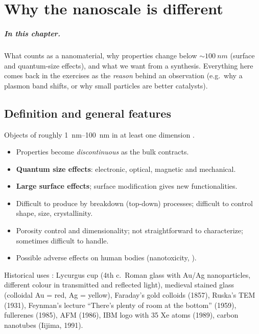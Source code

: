 \chapter{Why the nanoscale is different}
\label{ch:fundamentals}

\paragraph{In this chapter.} What counts as a nanomaterial, why properties change below
$\sim\SI{100}{nm}$ (surface and quantum-size effects), and what we want from a synthesis.
Everything here comes back in the exercises as the \emph{reason} behind an observation
(e.g.\ why a plasmon band shifts, or why small particles are better catalysts).

\section{Definition and general features}
\begin{defbox}
Objects of roughly \SIrange{1}{100}{nm} in at least one dimension .
\begin{itemize}
  \item Properties become \emph{discontinuous} as the bulk contracts.
  \item \textbf{Quantum size effects}: electronic, optical, magnetic and mechanical.
  \item \textbf{Large surface effects}; surface modification gives new functionalities.
  \item Difficult to produce by breakdown (top-down) processes; difficult to control shape, size, crystallinity.
  \item Porosity control and dimensionality; not straightforward to characterize; sometimes difficult to handle.
  \item Possible adverse effects on human bodies (nanotoxicity, ).
\end{itemize}
\end{defbox}

Historical uses : Lycurgus cup (4th c.\ Roman glass with Au/Ag nanoparticles,
different colour in transmitted and reflected light), medieval stained glass (colloidal Au = red,
Ag = yellow), Faraday's gold colloids (1857), Ruska's TEM (1931), Feynman's lecture
``There's plenty of room at the bottom'' (1959), fullerenes (1985), AFM (1986),
IBM logo with 35 Xe atoms (1989), carbon nanotubes (Iijima, 1991).

